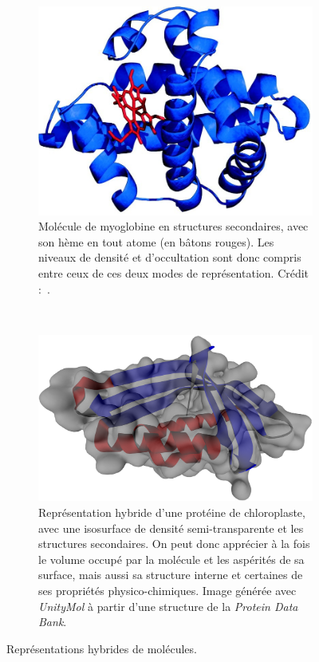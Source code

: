 	\begin{figure}[!htbp]
		\begin{subfigure}[t]{0.40\textwidth}
			\centering
			\includegraphics[width=\textwidth]{figures/ch1/myoglobin}
			\caption[Représentation hybride d'une protéine]{Molécule de myoglobine en  structures secondaires, avec son hème en \og tout atome \fg{} (en bâtons rouges). Les niveaux de densité et d'occultation sont donc compris entre ceux de ces deux modes de représentation. Crédit :~\cite{Ordway3441}.}
			\label{fig:myoglobin}
		\end{subfigure}
		~
		\begin{subfigure}[t]{0.58\textwidth}
			\centering
			\includegraphics[width=\textwidth]{figures/ch1/transSS}
			\caption[Surface semi-transparente et structures secondaires]{Représentation hybride d'une protéine de chloroplaste, avec une isosurface de densité semi-transparente et les structures secondaires. On peut donc apprécier à la fois le volume occupé par la molécule et les aspérités de sa surface, mais aussi sa structure interne et certaines de ses propriétés physico-chimiques. Image générée avec \emph{UnityMol} à partir d'une structure de la \emph{Protein Data Bank}.}
			\label{fig:transSS}
		\end{subfigure}
		\label{fig:hybrid}
		\caption{Représentations hybrides de molécules.}
	\end{figure}	
	
